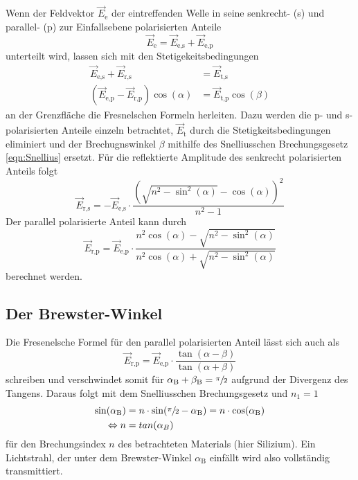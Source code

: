 Wenn der Feldvektor $\vec{E}_\text{e}$ der eintreffenden Welle in seine senkrecht- (s) und parallel- (p) zur Einfallsebene polarisierten Anteile 
\begin{equation*}
    \vec{E}_\text{e} = \vec{E}_\text{e,s} + \vec{E}_\text{e,p}
\end{equation*}
unterteilt wird, lassen sich mit den Stetigekeitsbedingungen
\begin{align*}
    \vec{E}_\text{e,s} + \vec{E}_\text{r,s} &= \vec{E}_\text{t,s} \\
    \left(\vec{E}_\text{e,p} - \vec{E}_\text{r,p}\right) \cos(\alpha) &= \vec{E}_\text{t,p} \cos(\beta)
\end{align*}
an der Grenzfläche
die Fresnelschen Formeln herleiten. Dazu werden die p- und s- polarisierten Anteile einzeln betrachtet, $\vec{E}_\text{t}$ durch die 
Stetigkeitsbedingungen eliminiert und der Brechugnswinkel $\beta$ mithilfe des Snelliusschen Brechungsgesetz \eqref{eqn:Snellius} ersetzt. 
Für die reflektierte Amplitude des senkrecht polarisierten Anteils folgt
\begin{equation}
    \label{eqn:Fresnel_senkrecht}
    \vec{E}_\text{r,s} = -\vec{E}_\text{e,s} \cdot \frac{\left(\sqrt{n^2 - \sin^2(\alpha)} -\cos(\alpha)\right)^2}{n^2 - 1}
\end{equation}
Der parallel polarisierte Anteil kann durch
\begin{equation}
    \label{eqn:Fresnel_parallel}
    \vec{E}_\text{r,p} = \vec{E}_\text{e,p} \cdot \frac{n^2 \cos(\alpha) - \sqrt{n^2 - \sin^2(\alpha)}}{n^2 \cos(\alpha) + \sqrt{n^2 - \sin^2(\alpha)}}
\end{equation}
berechnet werden.

\subsection{Der Brewster-Winkel}
\label{subsec:T_Brewster}
Die Fresenelsche Formel für den parallel polarisierten Anteil lässt sich auch als 
\begin{equation*}
    \vec{E}_\text{r,p} = \vec{E}_\text{e,p} \cdot \frac{\tan(\alpha - \beta)}{\tan(\alpha + \beta)}
\end{equation*}
schreiben und verschwindet somit für $\alpha_\text{B} + \beta_\text{B} = \sfrac{\pi}{2}$ aufgrund der Divergenz des Tangens. Daraus folgt mit dem Snelliusschen Brechungsgesetz und $n_1 = 1$
\begin{align}
    \sin(\alpha_\text{B}) &= n \cdot \sin(\sfrac{\pi}{2} - \alpha_\text{B}) = n \cdot \cos(\alpha_\text{B}) \nonumber \\
    \Leftrightarrow n &= tan(\alpha_B)
    \label{eqn:Brewster}
\end{align}
für den Brechungsindex $n$ des betrachteten Materials (hier Silizium).
Ein Lichtstrahl, der unter dem Brewster-Winkel $\alpha_\text{B}$ einfällt wird also vollständig transmittiert.

